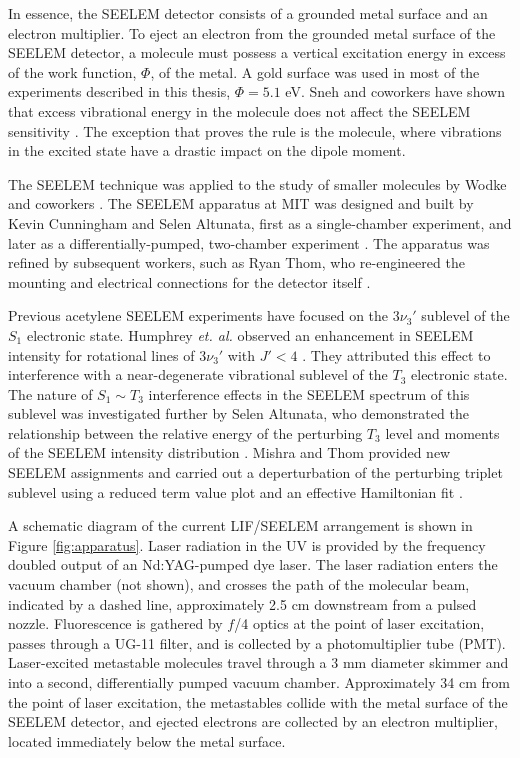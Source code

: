 \documentclass[12pt]{mitthesis}
\begin{document}
In essence, the SEELEM detector consists of a grounded metal surface
and an electron multiplier.  To eject an electron from the grounded
metal surface of the SEELEM detector, a molecule must possess a
vertical excitation energy in excess of the work function, $\Phi$, of
the metal.  A gold surface was used in most of the experiments
described in this thesis, $\Phi = 5.1$ eV.  Sneh and coworkers have
shown that excess vibrational energy in the molecule does not affect
the SEELEM sensitivity \cite{sneh86}.  The exception that proves the
rule is the  molecule, where vibrations in the excited state
have a drastic impact on the dipole moment\cite{white05}.

The SEELEM technique was applied to the study of smaller molecules by
Wodke and coworkers \cite{price92, drabbels95, morgan96, humphrey97}.
The SEELEM apparatus at MIT was designed and built by Kevin Cunningham
and Selen Altunata, first as a single-chamber experiment, and later as
a differentially-pumped, two-chamber experiment
\cite{cunningham-thesis, altunata-thesis}.  The apparatus was refined
by subsequent workers, such as Ryan Thom, who re-engineered the
mounting and electrical connections for the detector itself
\cite{thom-thesis}.

Previous acetylene SEELEM experiments have focused on the $3\nu_3'$
 sublevel of the $S_1$ electronic state.  Humphrey \emph{et.
  al.} observed an enhancement in SEELEM intensity for rotational
lines of $3\nu_3'$  with $J' < 4$ \cite{humphrey97}.  They
attributed this effect to interference with a near-degenerate
vibrational sublevel of the $T_3$ electronic state.  The nature of
$S_1 \sim T_3$ interference effects in the SEELEM spectrum of this
sublevel was investigated further by Selen Altunata, who demonstrated
the relationship between the relative energy of the perturbing $T_3$
level and moments of the SEELEM intensity distribution
\cite{altunata00}.  Mishra and Thom provided new SEELEM assignments
and carried out a deperturbation of the perturbing triplet sublevel
using a reduced term value plot and an effective Hamiltonian fit
\cite{mishra04}.

A schematic diagram of the current LIF/SEELEM arrangement is shown in
Figure \ref{fig:apparatus}.  Laser radiation in the UV is provided by
the frequency doubled output of an Nd:YAG-pumped dye laser.  The laser
radiation enters the vacuum chamber (not shown), and crosses the path
of the molecular beam, indicated by a dashed line, approximately 2.5
cm downstream from a pulsed nozzle.  Fluorescence is gathered by $f$/4
optics at the point of laser excitation, passes through a UG-11
filter, and is collected by a photomultiplier tube (PMT).
Laser-excited metastable molecules travel through a 3 mm diameter
skimmer and into a second, differentially pumped vacuum chamber.
Approximately 34 cm from the point of laser excitation, the
metastables collide with the metal surface of the SEELEM detector, and
ejected electrons are collected by an electron multiplier, located
immediately below the metal surface.
\end{document}
